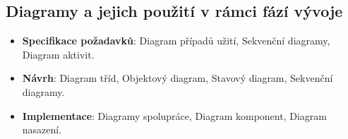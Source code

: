 \subsection{Diagramy a jejich použití v rámci fází vývoje}
\begin{itemize}
\item \textbf{Specifikace požadavků}: Diagram případů užití, Sekvenční diagramy, Diagram aktivit.
\item \textbf{Návrh}: Diagram tříd, Objektový diagram, Stavový diagram, Sekvenční diagramy.
\item \textbf{Implementace}: Diagramy spolupráce, Diagram komponent, Diagram nasazení.
\end{itemize}
